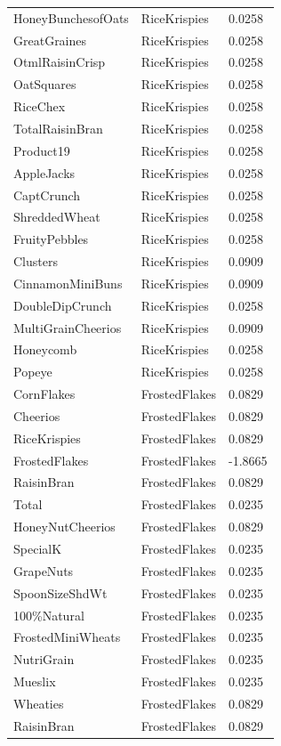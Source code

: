 \begin{table}[!htbp]
\begin{tabular}{lll}
\\
HoneyBunchesofOats & RiceKrispies & 0.0258
\\
GreatGraines & RiceKrispies & 0.0258
\\
OtmlRaisinCrisp & RiceKrispies & 0.0258
\\
OatSquares & RiceKrispies & 0.0258
\\
RiceChex & RiceKrispies & 0.0258
\\
TotalRaisinBran & RiceKrispies & 0.0258
\\
Product19 & RiceKrispies & 0.0258
\\
AppleJacks & RiceKrispies & 0.0258
\\
CaptCrunch & RiceKrispies & 0.0258
\\
ShreddedWheat & RiceKrispies & 0.0258
\\
FruityPebbles & RiceKrispies & 0.0258
\\
Clusters & RiceKrispies & 0.0909
\\
CinnamonMiniBuns & RiceKrispies & 0.0909
\\
DoubleDipCrunch & RiceKrispies & 0.0258
\\
MultiGrainCheerios & RiceKrispies & 0.0909
\\
Honeycomb & RiceKrispies & 0.0258
\\
Popeye & RiceKrispies & 0.0258
\\
CornFlakes & FrostedFlakes & 0.0829
\\
Cheerios & FrostedFlakes & 0.0829
\\
RiceKrispies & FrostedFlakes & 0.0829
\\
FrostedFlakes & FrostedFlakes & -1.8665
\\
RaisinBran & FrostedFlakes & 0.0829
\\
Total & FrostedFlakes & 0.0235
\\
HoneyNutCheerios & FrostedFlakes & 0.0829
\\
SpecialK & FrostedFlakes & 0.0235
\\
GrapeNuts & FrostedFlakes & 0.0235
\\
SpoonSizeShdWt & FrostedFlakes & 0.0235
\\
100\%Natural & FrostedFlakes & 0.0235
\\
FrostedMiniWheats & FrostedFlakes & 0.0235
\\
NutriGrain & FrostedFlakes & 0.0235
\\
Mueslix & FrostedFlakes & 0.0235
\\
Wheaties & FrostedFlakes & 0.0829
\\
RaisinBran & FrostedFlakes & 0.0829

\end{tabular}
\end{table}
